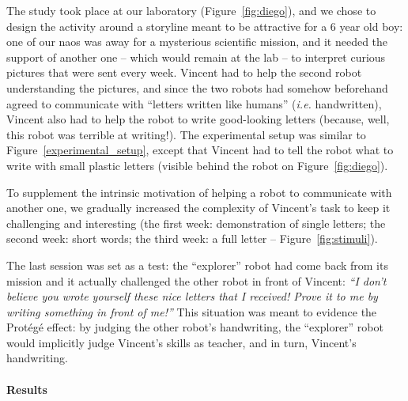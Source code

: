 \documentclass{article}
\newcommand{\ie}{\textit{i.e.}\xspace}
\begin{document}
The study took place at our laboratory (Figure~\ref{fig:diego}), and we chose to
design the activity around a storyline meant to be attractive for a 6 year old
boy: one of our {\sc nao}s was away for a mysterious scientific mission, and it
needed the support of another one -- which would remain at the lab -- to
interpret curious pictures that were sent every week. Vincent had to help the
second robot understanding the pictures, and since the two robots had somehow
beforehand agreed to communicate with ``letters written like humans'' (\ie
handwritten), Vincent also had to help the robot to write good-looking letters
(because, well, this robot was terrible at writing!). The experimental setup was
similar to Figure~\ref{experimental_setup}, except that Vincent had to tell the
robot what to write with small plastic letters (visible behind the robot on
Figure~\ref{fig:diego}).

To supplement the intrinsic motivation of helping a robot to communicate with
another one, we gradually increased the complexity of Vincent's task to keep it
challenging and interesting (the first week: demonstration of single letters;
the second week: short words; the third week: a full letter --
Figure~\ref{fig:stimuli}).

The last session was set as a test: the ``explorer'' robot had come back from
its mission and it actually challenged the other robot in front of Vincent:
\emph{``I don't believe you wrote yourself these nice letters that I received!
Prove it to me by writing something in front of me!''} This situation was meant
to evidence the Protégé effect: by judging the other robot's handwriting, the
``explorer'' robot would implicitly judge Vincent's skills as teacher, and in
turn, Vincent's handwriting.

\paragraph{Results}
\end{document}
